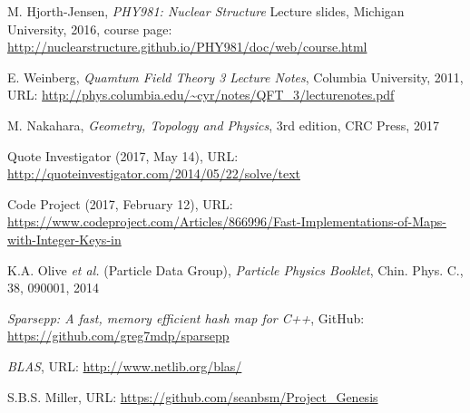 \documentclass[10pt,twoside]{report}
\begin{document}
\begin{thebibliography}{9}
		M. Hjorth-Jensen, \emph{PHY981: Nuclear Structure} Lecture slides, Michigan University, 2016, course page: \url{http://nuclearstructure.github.io/PHY981/doc/web/course.html}
		
		E. Weinberg, \emph{Quamtum Field Theory 3 Lecture Notes}, Columbia University, 2011, URL: \url{http://phys.columbia.edu/~cyr/notes/QFT_3/lecturenotes.pdf}
		
		M. Nakahara, \emph{Geometry, Topology and Physics}, 3rd edition, CRC Press, 2017
		
		Quote Investigator (2017, May 14), URL: \url{http://quoteinvestigator.com/2014/05/22/solve/text}
		
		Code Project (2017, February 12), URL: \url{https://www.codeproject.com/Articles/866996/Fast-Implementations-of-Maps-with-Integer-Keys-in}
		
		K.A. Olive \emph{et al.} (Particle Data Group), \emph{Particle Physics Booklet}, Chin. Phys. C., 38, 090001, 2014
		
		\emph{Sparsepp: A fast, memory efficient hash map for C++}, GitHub: \url{https://github.com/greg7mdp/sparsepp}
		
		\emph{BLAS}, URL: \url{http://www.netlib.org/blas/}
		
		S.B.S. Miller, URL: \url{https://github.com/seanbsm/Project_Genesis}
		
	\end{thebibliography}
	
\end{document}
